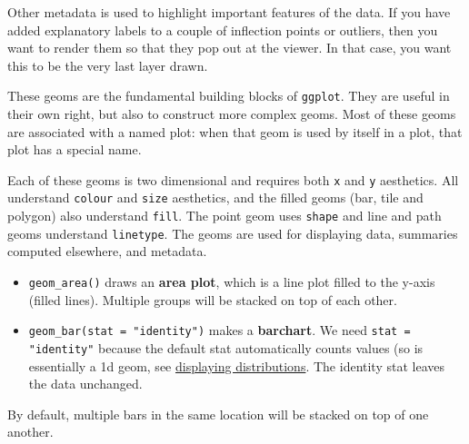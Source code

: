 Other metadata is used to highlight important features of the data. If
you have added explanatory labels to a couple of inflection points or
outliers, then you want to render them so that they pop out at the
viewer. In that case, you want this to be the very last layer drawn.


These geoms are the fundamental building blocks of \texttt{ggplot}. They
are useful in their own right, but also to construct more complex geoms.
Most of these geoms are associated with a named plot: when that geom is
used by itself in a plot, that plot has a special name.

Each of these geoms is two dimensional and requires both \texttt{x} and
\texttt{y} aesthetics. All understand \texttt{colour} and \texttt{size}
aesthetics, and the filled geoms (bar, tile and polygon) also understand
\texttt{fill}. The point geom uses \texttt{shape} and line and path
geoms understand \texttt{linetype}. The geoms are used for displaying
data, summaries computed elsewhere, and metadata.

\begin{itemize}
\itemsep1pt\parskip0pt
\item
  \texttt{geom\_area()} draws an \textbf{area plot}, which is a line
  plot filled to the y-axis (filled lines). Multiple groups will be
  stacked on top of each other.  
\item
  \texttt{geom\_bar(stat = "identity")} makes a \textbf{barchart}. We
  need \texttt{stat = "identity"} because the default stat automatically
  counts values (so is essentially a 1d geom, see
  \hyperref[sec:distributions]{displaying distributions}. The identity
  stat leaves the data unchanged.  
\end{itemize}

By default, multiple bars in the same location will be stacked on top of
one another.

